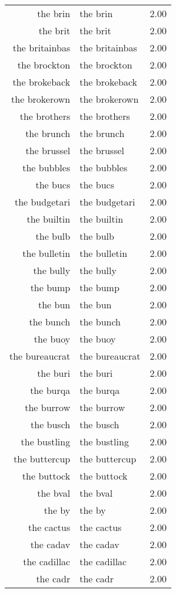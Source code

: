 \begin{table}[ht]
\begin{tabular}{rlr}
  the brin & the brin & 2.00 \\ 
  the brit & the brit & 2.00 \\ 
  the britainbas & the britainbas & 2.00 \\ 
  the brockton & the brockton & 2.00 \\ 
  the brokeback & the brokeback & 2.00 \\ 
  the brokerown & the brokerown & 2.00 \\ 
  the brothers & the brothers & 2.00 \\ 
  the brunch & the brunch & 2.00 \\ 
  the brussel & the brussel & 2.00 \\ 
  the bubbles & the bubbles & 2.00 \\ 
  the bucs & the bucs & 2.00 \\ 
  the budgetari & the budgetari & 2.00 \\ 
  the builtin & the builtin & 2.00 \\ 
  the bulb & the bulb & 2.00 \\ 
  the bulletin & the bulletin & 2.00 \\ 
  the bully & the bully & 2.00 \\ 
  the bump & the bump & 2.00 \\ 
  the bun & the bun & 2.00 \\ 
  the bunch & the bunch & 2.00 \\ 
  the buoy & the buoy & 2.00 \\ 
  the bureaucrat & the bureaucrat & 2.00 \\ 
  the buri & the buri & 2.00 \\ 
  the burqa & the burqa & 2.00 \\ 
  the burrow & the burrow & 2.00 \\ 
  the busch & the busch & 2.00 \\ 
  the bustling & the bustling & 2.00 \\ 
  the buttercup & the buttercup & 2.00 \\ 
  the buttock & the buttock & 2.00 \\ 
  the bval & the bval & 2.00 \\ 
  the by & the by & 2.00 \\ 
  the cactus & the cactus & 2.00 \\ 
  the cadav & the cadav & 2.00 \\ 
  the cadillac & the cadillac & 2.00 \\ 
  the cadr & the cadr & 2.00 \\ 

\end{tabular}
\end{table}
